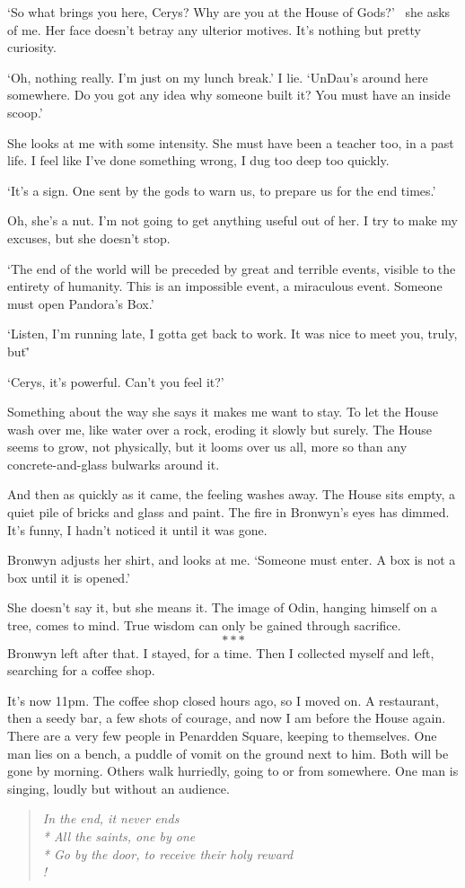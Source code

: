 `So what brings you here, Cerys? Why are you at the House of Gods?'~%
she asks of me. Her face doesn't betray any ulterior motives. It's
nothing but pretty curiosity.

`Oh, nothing really. I'm just on my lunch break.' I lie. `UnDau's
around here somewhere. Do you got any idea why someone built it? You
must have an inside scoop.'

She looks at me with some intensity. She must have been a teacher too,
in a past life. I feel like I've done something wrong, I dug too deep
too quickly.

`It's a sign. One sent by the gods to warn us, to prepare us for the
end times.'

Oh, she's a nut. I'm not going to get anything useful out of her. I
try to make my excuses, but she doesn't stop.

`The end of the world will be preceded by great and terrible events,
visible to the entirety of humanity. This is an impossible event, a
miraculous event. Someone must open Pandora's Box.'

`Listen, I'm running late, I gotta get back to work. It was nice to
meet you, truly, but\='

`Cerys, it's powerful. Can't you feel it?'

Something about the way she says it makes me want to stay. To let the
House wash over me, like water over a rock, eroding it slowly but
surely. The House seems to grow, not physically, but it looms over us
all, more so than any concrete-and-glass bulwarks around it.

And then as quickly as it came, the feeling washes away. The House
sits empty, a quiet pile of bricks and glass and paint. The fire in
Bronwyn's eyes has dimmed. It's funny, I hadn't noticed it until it
was gone.

Bronwyn adjusts her shirt, and looks at me. `Someone must enter. A box
is not a box until it is opened.'

She doesn't say it, but she means it. The image of Odin, hanging
himself on a tree, comes to mind. True wisdom can only be gained
through sacrifice.
\nobreak
\[***\]
\nobreak
Bronwyn left after that. I stayed, for a time. Then I collected myself
and left, searching for a coffee shop.

It's now 11pm. The coffee shop closed hours ago, so I moved on. A
restaurant, then a seedy bar, a few shots of courage, and now I am
before the House again. There are a very few people in Penardden
Square, keeping to themselves. One man lies on a bench, a puddle of
vomit on the ground next to him. Both will be gone by morning. Others
walk hurriedly, going to or from somewhere. One man is singing, loudly
but without an audience.
\allowbreak
\begin{verse}\it
In the end, it never ends\\*
All the saints, one by one\\*
Go by the door, to receive their holy reward\\!
\end{verse}

